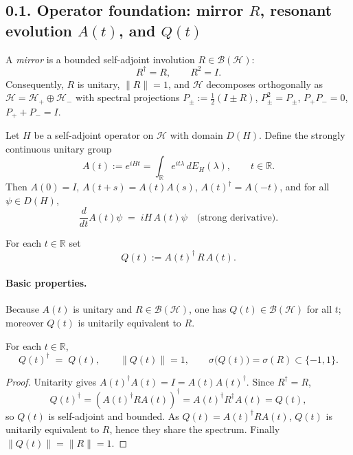 
\subsection*{0.1. Operator foundation: mirror $R$, resonant evolution $A(t)$, and $Q(t)$}

\begin{definition}[Mirror]
A \emph{mirror} is a bounded self-adjoint involution $R\in\mathcal{B}(\mathcal{H})$:
\[
R^\dagger=R,\qquad R^2=I.
\]
Consequently, $R$ is unitary, $\|R\|=1$, and $\mathcal{H}$ decomposes orthogonally as
$\mathcal{H}=\mathcal{H}_+\oplus\mathcal{H}_-$ with spectral projections
$P_\pm:=\frac12(I\pm R)$, $P_\pm^2=P_\pm$, $P_+P_-=0$, $P_++P_-=I$.
\end{definition}

\begin{definition}
Let $H$ be a self-adjoint operator on $\mathcal{H}$ with domain $D(H)$.
Define the strongly continuous unitary group
\[
A(t):=e^{iHt}=\int_{\mathbb{R}} e^{it\lambda}\,dE_H(\lambda),\qquad t\in\mathbb{R}.
\]
Then $A(0)=I$, $A(t+s)=A(t)A(s)$, $A(t)^\dagger=A(-t)$, and for all $\psi\in D(H)$,
\[
\frac{d}{dt}A(t)\psi\;=\;iH\,A(t)\psi\quad\text{(strong derivative)}.
\]
\end{definition}

\begin{definition}
For each $t\in\mathbb{R}$ set
\[
Q(t):=A(t)^\dagger\,R\,A(t).
\]
\end{definition}

\paragraph{Basic properties.}
Because $A(t)$ is unitary and $R\in\mathcal{B}(\mathcal{H})$, one has $Q(t)\in\mathcal{B}(\mathcal{H})$ for all $t$; moreover $Q(t)$ is unitarily equivalent to $R$.

\begin{theorem}
For each $t\in\mathbb{R}$,
\[
Q(t)^\dagger \;=\; Q(t),\qquad \|Q(t)\|=1,\qquad \sigma\big(Q(t)\big)=\sigma(R)\subset\{-1,1\}.
\]
\end{theorem}

\begin{proof}
Unitarity gives $A(t)^\dagger A(t)=I=A(t)A(t)^\dagger$. Since $R^\dagger=R$,
\[
Q(t)^\dagger=(A(t)^\dagger R A(t))^\dagger=A(t)^\dagger R^\dagger A(t)=Q(t),
\]
so $Q(t)$ is self-adjoint and bounded. As $Q(t)=A(t)^\dagger R A(t)$, $Q(t)$ is unitarily equivalent to $R$, hence they share the spectrum.
Finally $\|Q(t)\|=\|R\|=1$.
\end{proof}

